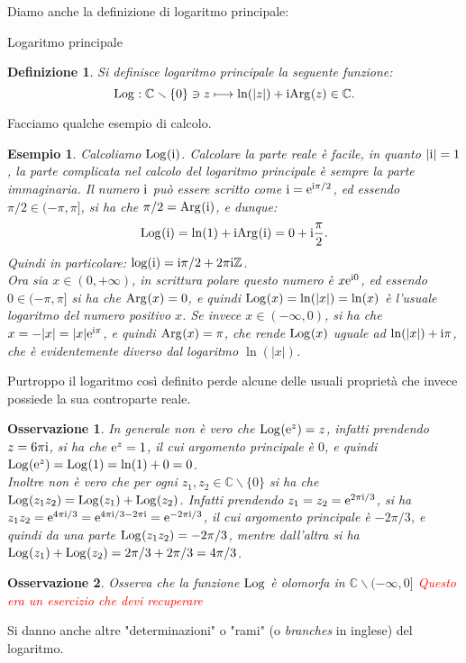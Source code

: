 \documentclass[11pt]{book}
\theoremstyle{Definizione}
\newtheorem*{mydef}{Definizione}
\theoremstyle{TeoremaProposizioneLemmaCorollarioCongettura}
\theoremstyle{OsservazioneNotaEsempio}
\newtheorem{myobs}{Osservazione}[section]
\newtheorem{myes}{Esempio}[section]
\newcommand{\Z}{\mathbb{Z}}
\newcommand{\C}{\mathbb{C}}
\newcommand{\tolto}{\smallsetminus}
\newcommand{\Arg}[1][]{\textup{Arg}_{#1}}
\renewcommand{\i}{\textup{i}}
\newcommand{\e}{\textup{e}}
\newcommand{\Log}[1][]{\textup{Log}_{#1}}
\begin{document}
Diamo anche la definizione di logaritmo principale:
\begin{boxdef}{Logaritmo principale}
\begin{mydef}
Si definisce logaritmo principale la seguente funzione:
$$
\Log: \C \tolto \{0\} \ni z \longmapsto \ln(|z|) + \i \Arg(z) \in \C.
$$
\end{mydef}
\end{boxdef}
\noindent
Facciamo qualche esempio di calcolo.
\begin{myes}
Calcoliamo $\Log(\i)$. Calcolare la parte reale è facile, in quanto $|\i| = 1$, la parte complicata nel calcolo del logaritmo principale è sempre la parte immaginaria. Il numero $\i$ può essere scritto come $\i = \e^{\i\pi/2}$, ed essendo $\pi/2\in (-\pi,\pi]$, si ha che $\pi/2 = \Arg(\i)$, e dunque:
$$
\Log(\i) = \ln(1)+  \i \Arg(\i) = 0 + \i \frac{\pi}{2}.
$$
Quindi in particolare: $\log(\i) = \i\pi/2 + 2\pi\i\Z$.\\
Ora sia $x\in (0,+\infty)$, in scrittura polare questo numero è $x \e^{\i 0}$, ed essendo $0\in (-\pi,\pi]$ si ha che $\Arg(x) = 0$, e quindi $\Log(x) = \ln(|x|) = \ln(x)$ è l'usuale logaritmo del numero positivo $x$. Se invece $x\in (-\infty,0)$, si ha che $x = -|x| = |x|\e^{\i \pi}$, e quindi $\Arg(x) = \pi$, che rende $\Log(x)$ uguale ad $\ln(|x|)+ \i\pi$, che è evidentemente diverso dal logaritmo $\ln(|x|)$.
\end{myes}
Purtroppo il logaritmo così definito perde alcune delle usuali proprietà che invece possiede la sua controparte reale.
\begin{myobs}
In generale non è vero che $\Log(\e^{z}) = z$, infatti prendendo $z = 6\pi\i$, si ha che $\e^{z} = 1$, il cui argomento principale è $0$, e quindi $\Log(\e^{z}) = \Log(1) = \ln(1)+0 = 0$.\\
Inoltre non è vero che per ogni $z_1,z_2\in \C\tolto \{0\}$ si ha che $\Log(z_1z_2) = \Log(z_1)+\Log(z_2)$. Infatti prendendo $z_1 = z_2 = \e^{2\pi\i/3}$, si ha $z_1z_2 = \e^{4\pi\i/3} = \e^{4\pi\i/3-2\pi\i} = \e^{-2\pi\i/3}$, il cui argomento principale è $-2\pi/3$, e quindi da una parte $\Log(z_1z_2) = -2\pi/3$, mentre dall'altra si ha $\Log(z_1)+\Log(z_2) = 2\pi/3+2\pi/3 = 4\pi/3$.
\end{myobs}
\begin{myobs}
Osserva che la funzione $\Log$ è olomorfa in $\C \tolto (-\infty,0]$ \textcolor{red}{Questo era un esercizio che devi recuperare}
\end{myobs}
Si danno anche altre "determinazioni" o "rami" (o \textsl{branches} in inglese) del logaritmo.
\end{document}
